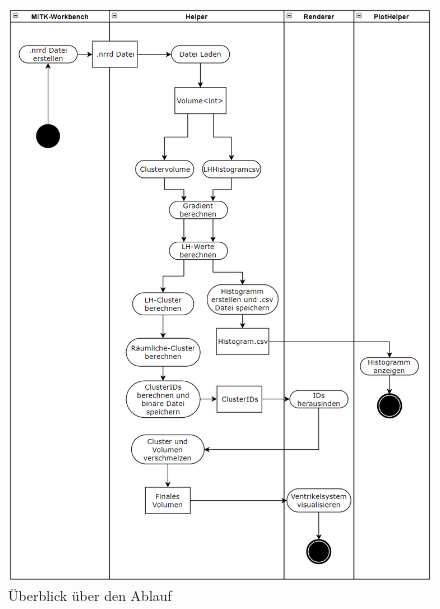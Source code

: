 \begin{figure}
\centering 
\includegraphics[width=\textwidth]{Logos/Ueberblick2.png}
\caption{Überblick über den Ablauf} 
\label{fig:ueberblick} 
\end{figure}

